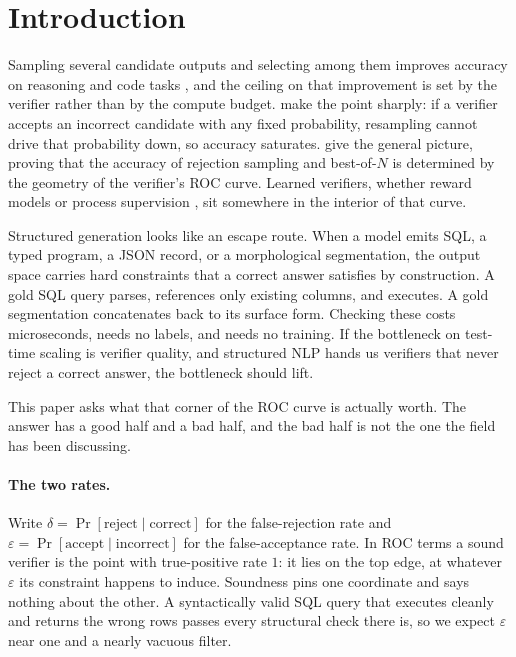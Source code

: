 \documentclass[11pt]{article}
\begin{document}
\begin{abstract}
ungated row on accuracy, underscoring that a grammar constraint and a sound verifier answer different questions.
\end{abstract}

\section{Introduction}\label{sec:intro}
Sampling several candidate outputs and selecting among them improves accuracy on reasoning and code tasks \citep{snell2024scaling,brown2024monkeys,wang2023self}, and the ceiling on that improvement is set by the verifier rather than by the compute budget. \citet{stroebl2024verifier} make the point sharply: if a verifier accepts an incorrect candidate with any fixed probability, resampling cannot drive that probability down, so accuracy saturates. \citet{dorner2025rocnreroll} give the general picture, proving that the accuracy of rejection sampling and best-of-$N$ is determined by the geometry of the verifier's ROC curve. Learned verifiers, whether reward models or process supervision \citep{lightman2024verify}, sit somewhere in the interior of that curve.

Structured generation looks like an escape route. When a model emits SQL, a typed program, a JSON record, or a morphological segmentation, the output space carries hard constraints that a correct answer satisfies by construction. A gold SQL query parses, references only existing columns, and executes. A gold segmentation concatenates back to its surface form. Checking these costs microseconds, needs no labels, and needs no training. If the bottleneck on test-time scaling is verifier quality, and structured NLP hands us verifiers that never reject a correct answer, the bottleneck should lift.

This paper asks what that corner of the ROC curve is actually worth. The answer has a good half and a bad half, and the bad half is not the one the field has been discussing.

\paragraph{The two rates.} Write $\delta=\Pr[\text{reject}\mid\text{correct}]$ for the false-rejection rate and $\varepsilon=\Pr[\text{accept}\mid\text{incorrect}]$ for the false-acceptance rate. In ROC terms a sound verifier is the point with true-positive rate $1$: it lies on the top edge, at whatever $\varepsilon$ its constraint happens to induce. Soundness pins one coordinate and says nothing about the other. A syntactically valid SQL query that executes cleanly and returns the wrong rows passes every structural check there is, so we expect $\varepsilon$ near one and a nearly vacuous filter.
\end{document}

